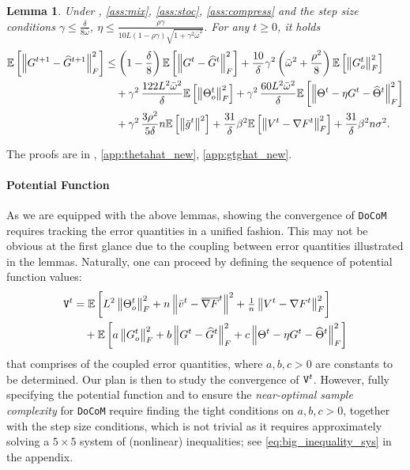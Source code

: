 \documentclass[10pt]{article} %
\theoremstyle{plain}
\newtheorem{lemma}[theorem]{Lemma}
\theoremstyle{definition}
\theoremstyle{remark}
\newcommand{\aname}{{\tt DoCoM}}
\newcommand{\grdF}{\nabla F}
\newcommand{\bw}{\bar{\omega}}
\newcommand{\avgg}{\bar{g}}
\newcommand{\norm}[1]{\left\| #1 \right\|}
\newcommand{\nl}{\nonumber\\}
\newcommand{\ER}{{\tt V}}
\newcommand{\avggrdF}{\overline{\nabla F}}
\newcommand{\hatTheta}{\widehat{\Theta}}
\newcommand{\hatG}{\widehat{G}}
\newcommand{\avgv}{\bar{v}}
\begin{document}
\begin{lemma} \label{lem:gtghat_new} Under , \ref{ass:mix}, \ref{ass:stoc}, \ref{ass:compress} and the step size conditions $\gamma \leq \frac{\delta}{8 \bw}$, $\eta \leq \frac{ \rho \gamma }{ 10 L (1-\rho\gamma) \sqrt{1 + \gamma^2 \bw^2} }$. For any $t \geq 0$, it holds
    \begin{align}
    \mathbb{E} \left[ \norm{ G^{t+1} - \hatG^{t+1} }_F^2 \right] & \leq \left(1 - \frac{\delta}{8} \right) \mathbb{E} \left[ \norm{ G^{t} - \hatG^{t} }_F^2 \right] + \frac{10}{\delta} \gamma^2 \left( \bw^2 + \frac{\rho^2 }{8} \right) \mathbb{E} \left[ \norm{G_o^t}_F^2 \right] \\
    & \quad + \gamma^2 \, \frac{122L^2\bw^2}{\delta} \mathbb{E} \left[ \norm{\Theta_o^t}_F^2 \right] + \gamma^2 \, \frac{60 L^2 \bw^2}{\delta} \mathbb{E} \left[ \norm{ \Theta^t - \eta G^t - \hatTheta^t }_F^2 \right] \nl
    & \quad + \gamma^2 \, \frac{3 \rho^2}{5 \delta} n \mathbb{E} \left[ \norm{ \avgg^t }^2 \right]  + \frac{31}{\delta} \beta^2 \mathbb{E} \left[ \norm{ V^t - \grdF^t }_F^2 \right] + \frac{31}{\delta} \beta^2 n \sigma^2. \notag
    \end{align}
\end{lemma}
The proofs are in , \ref{app:thetahat_new}, \ref{app:gtghat_new}. 

\paragraph{Potential Function} As we are equipped with the above lemmas, showing the convergence of {\aname} requires tracking the error quantities in a unified fashion. This may not be obvious at the first glance due to the coupling between error quantities illustrated in the lemmas. Naturally, one can proceed by defining the sequence of potential function values: 
\begin{align}
 \ER^{t} & = \mathbb{E} \left[ L^2 \norm{\Theta_o^{t}}_F^2 + n \norm{ \avgv^{t} - \avggrdF^{t} }^2 + {\textstyle \frac{1}{n}} \norm{V^{t} - \grdF^{t} }_F^2 \right] \notag \\
    & \quad + \mathbb{E} \left[ a \norm{G_o^{t}}_F^2 + b \norm{ G^{t} - \hatG^{t} }_F^2 + c \norm{ \Theta^{t} - \eta G^{t} - \hatTheta^{t} }_F^2 \right] \label{eq:Vt_design} 
\end{align}
that comprises of the coupled error quantities, where $a,b,c>0$ are constants to be determined. Our plan is then to study the convergence of $\ER^{t}$. 
However, fully specifying the potential function and to ensure the \emph{near-optimal sample complexity} for {\aname} require finding the tight conditions on $a,b,c>0$, together with the step size conditions, which is not trivial as it requires approximately solving a $5 \times 5$ system of (nonlinear) inequalities; see \eqref{eq:big_inequality_sys} in the appendix. 
\end{document}
